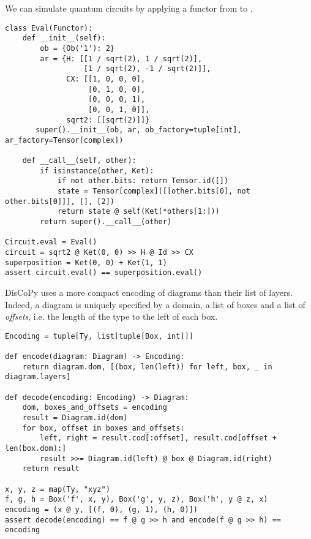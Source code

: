 \begin{example}
We can simulate quantum circuits by applying a functor from  to .
\begin{verbatim}
class Eval(Functor):
    def __init__(self):
        ob = {Ob('1'): 2}
        ar = {H: [[1 / sqrt(2), 1 / sqrt(2)],
                  [1 / sqrt(2), -1 / sqrt(2)]],
              CX: [[1, 0, 0, 0],
                   [0, 1, 0, 0],
                   [0, 0, 0, 1],
                   [0, 0, 1, 0]],
              sqrt2: [[sqrt(2)]]}
       super().__init__(ob, ar, ob_factory=tuple[int], ar_factory=Tensor[complex])

    def __call__(self, other):
        if isinstance(other, Ket):
            if not other.bits: return Tensor.id([])
            state = Tensor[complex]([[other.bits[0], not other.bits[0]]], [], [2])
            return state @ self(Ket(*others[1:]))
        return super().__call__(other)

Circuit.eval = Eval()
circuit = sqrt2 @ Ket(0, 0) >> H @ Id >> CX
superposition = Ket(0, 0) + Ket(1, 1)
assert circuit.eval() == superposition.eval()
\end{verbatim}
\end{example}

\begin{remark}
DisCoPy uses a more compact encoding of diagrams than their list of layers.
Indeed, a diagram is uniquely specified by a domain, a list of boxes and a list of \emph{offsets}, i.e. the length of the type to the left of each box.

\begin{verbatim}
Encoding = tuple[Ty, list[tuple[Box, int]]]

def encode(diagram: Diagram) -> Encoding:
    return diagram.dom, [(box, len(left)) for left, box, _ in diagram.layers]

def decode(encoding: Encoding) -> Diagram:
    dom, boxes_and_offsets = encoding
    result = Diagram.id(dom)
    for box, offset in boxes_and_offsets:
        left, right = result.cod[:offset], result.cod[offset + len(box.dom):]
        result >>= Diagram.id(left) @ box @ Diagram.id(right)
    return result

x, y, z = map(Ty, "xyz")
f, g, h = Box('f', x, y), Box('g', y, z), Box('h', y @ z, x)
encoding = (x @ y, [(f, 0), (g, 1), (h, 0)])
assert decode(encoding) == f @ g >> h and encode(f @ g >> h) == encoding
\end{verbatim}
\end{remark}


